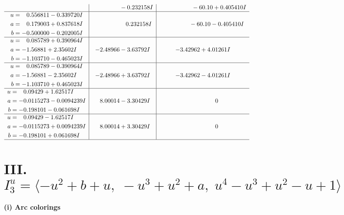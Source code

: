 \documentclass[1p]{elsarticle_modified}
\theoremstyle{definition}
\begin{document}
$$\begin{array}{c|c|c}
 & \phantom{-0.000000 } -0.232158 I & \phantom{-0.000000 -}     -6
0. 10   + 0.405410 I \\ \hline\begin{aligned}
u &= \phantom{-}0.556811 - 0.339720 I \\
a &= \phantom{-}0.179003 + 0.837618 I \\
b &= -0.500000 - 0.202005 I\end{aligned}
 & \phantom{-0.000000 -}0.232158 I & \phantom{-0.000000 }      -6
0. 10   - 0.405410 I \\ \hline\begin{aligned}
u &= \phantom{-}0.085789 + 0.390964 I \\
a &= -1.56881 + 2.35602 I \\
b &= -1.103710 - 0.465023 I\end{aligned}
 & -2.48966 - 3.63792 I & -3.42962 + 4.01261 I \\ \hline\begin{aligned}
u &= \phantom{-}0.085789 - 0.390964 I \\
a &= -1.56881 - 2.35602 I \\
b &= -1.103710 + 0.465023 I\end{aligned}
 & -2.48966 + 3.63792 I & -3.42962 - 4.01261 I \\ \hline\begin{aligned}
u &= \phantom{-}0.09429 + 1.62517 I \\
a &= -0.0115273 - 0.0094239 I \\
b &= -0.198101 - 0.061698 I\end{aligned}
 & \phantom{-}8.00014 - 3.30429 I & \phantom{-0.000000 } 0 \\ \hline\begin{aligned}
u &= \phantom{-}0.09429 - 1.62517 I \\
a &= -0.0115273 + 0.0094239 I \\
b &= -0.198101 + 0.061698 I\end{aligned}
 & \phantom{-}8.00014 + 3.30429 I & \phantom{-0.000000 } 0\\
 \hline 
 \end{array}$$\newpage\newpage\renewcommand{\arraystretch}{1}
\centering \section*{III. $I^u_{3}= \langle - u^2+b+u,\;- u^3+u^2+a,\;u^4- u^3+u^2- u+1 \rangle$}
\flushleft \textbf{(i) Arc colorings}\\
\end{document}
